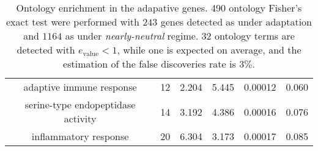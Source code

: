\documentclass{article}
\begin{document}
\begin{table*}[h!]
\begin{adjustbox}{width = 1\textwidth}
\begin{tabular}{|c|c|c|c|c|c|}
			adaptive immune response & 12 & 2.204 & 5.445 & 0.00012 & 0.060 \\
			serine-type endopeptidase activity & 14 & 3.192 & 4.386 & 0.00016 & 0.076 \\
			inflammatory response & 20 & 6.304 & 3.173 & 0.00017 & 0.085 \\
			\hline
		\end{tabular}
	\end{adjustbox}
	\label{table:ontology}
	\caption{
		Ontology enrichment in the adapative genes.
		490 ontology Fisher's exact test were performed with $243$ genes detected as under adaptation and $1164$ as under \textit{nearly-neutral} regime.
		$32$ ontology terms are detected with $e_{\mathrm{value}} < 1$, while one is expected on average, and the estimation of the false discoveries rate is $3\%$.
	}
\end{table*}
\end{document}
